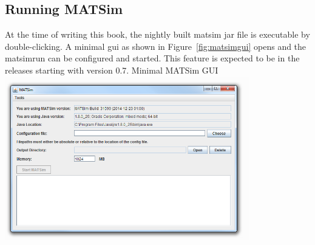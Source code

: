 \subsection{Running MATSim}
\label{sec:runexample}
At the time of writing this book, the nightly built \gls{matsim} \gls{jar} file is executable by double-clicking. A minimal \gls{gui} as shown in Figure~\ref{fig:matsimgui} opens and the \gls{matsimrun} can be configured and started. 
This feature is expected to be in the releases starting with version 0.7.
%
%
{Minimal MATSim GUI}%
{\label{fig:matsimgui}}%
{\includegraphics[width=0.8\textwidth, angle=0]{using/figures/matsimgui.png}}%
{}


